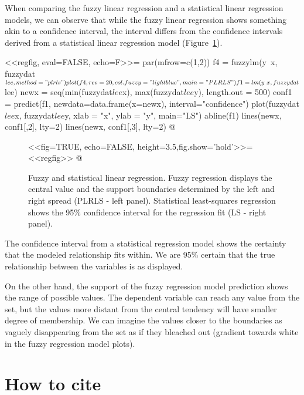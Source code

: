 \documentclass[a4paper]{article}
\begin{document}
When comparing the fuzzy linear regression and a statistical linear regression models, we can observe
that while the fuzzy linear regression shows something akin to a confidence interval,
the interval differs from the confidence intervals derived from a statistical linear 
regression model (Figure~\ref{fig:compare}).

<<regfig, eval=FALSE, echo=F>>=
par(mfrow=c(1,2))
f4 = fuzzylm(y~x, fuzzydat$lee, method="plrls")
plot(f4, res=20, col.fuzzy="lightblue", main="PLRLS")
f1 = lm(y~x, fuzzydat$lee)
newx = seq(min(fuzzydat$lee$x), max(fuzzydat$lee$y), length.out = 500)
conf1 = predict(f1, newdata=data.frame(x=newx),
                interval="confidence")
plot(fuzzydat$lee$x, fuzzydat$lee$y, xlab = "x", ylab = "y", main="LS")
abline(f1)
lines(newx, conf1[,2], lty=2)
lines(newx, conf1[,3], lty=2)
@

\begin{figure}[h]
  \begin{center}
<<fig=TRUE, echo=FALSE, height=3.5,fig.show='hold'>>=
<<regfig>>
@
\end{center}
\caption{Fuzzy and statistical linear regression. Fuzzy regression displays the central value and
the support boundaries determined by the left and right spread (PLRLS - left panel). 
Statistical least-squares regression
shows the 95\% confidence interval for the regression fit (LS - right panel).}
\label{fig:compare}
\end{figure}

The confidence interval from a statistical regression model shows the certainty that the modeled
relationship fits within. We are 95\% certain that the true relationship between the variables
is as displayed.

On the other hand, the support of the fuzzy regression model prediction shows the range of possible
values. The dependent variable can reach any value from the set, but the values more distant from the
central tendency will
have smaller degree of membership. We can imagine the values closer
to the boundaries as vaguely disappearing from the set as if they bleached out (gradient towards white
in the fuzzy regression model plots).

\section{How to cite}
\end{document}
